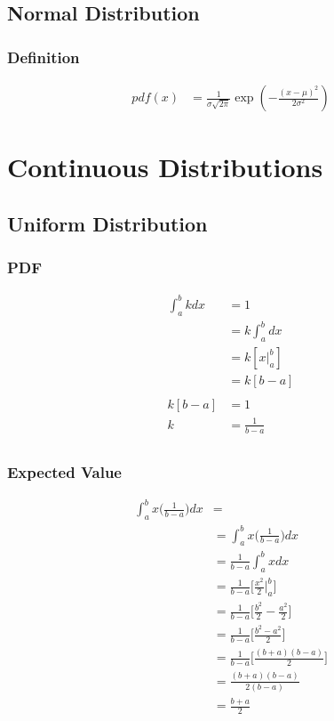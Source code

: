 \documentclass[]{book}
\begin{document}
\section {Normal Distribution}

\subsection {Definition}

\begin{align}
pdf(x) &= \frac{1}{\sigma\sqrt{2\pi}}\exp\left(-\frac{(x-\mu)^2}{2\sigma^2}\right)
\end{align}

\chapter{Continuous Distributions}

\section{Uniform Distribution}

\subsection{PDF}
\begin{align*}
\int_{a}^{b} {kdx} &= 1\\
&= k\int_{a}^{b} {dx}\\
&= k[x|_{a}^{b}]\\
&= k[b-a]\\	
\\
k[b-a] &= 1\\
k &= \frac{1} {b-a}\\
\end{align*}

\subsection{Expected Value}
\begin{align*}
\int_{a}^{b} {x\big( \frac{1}{b-a} \big)dx} &= \\
&= \int_{a}^{b} {x\big( \frac{1}{b-a} \big)dx}\\
&= \frac{1}{b-a}\int_{a}^{b} {xdx}\\
&= \frac{1}{b-a}\big[ \frac{x^2}{2}|_{a}^{b} \big]\\
&= \frac{1}{b-a}\big[ \frac{b^2}{2} - \frac{a^2}{2} \big]\\
&= \frac{1}{b-a}\big[ \frac{b^2-a^2}{2} \big]\\
&= \frac{1}{b-a}\big[ \frac{(b+a)(b-a)}{2} \big]\\
&= \frac{(b+a)(b-a)}{2(b-a)}\\
&= \frac{b+a}{2}\\
\end{align*}
\end{document}
